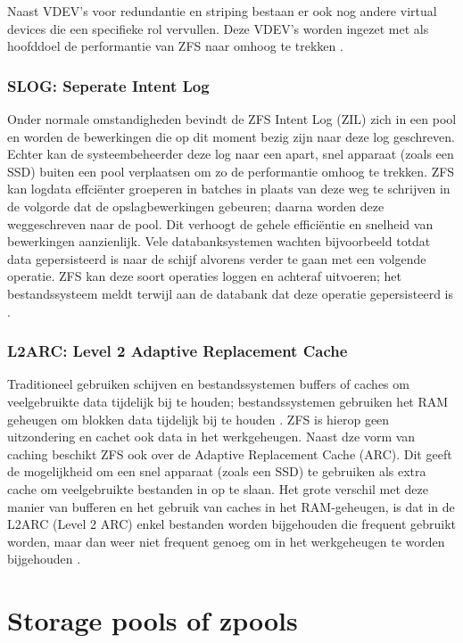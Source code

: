 Naast VDEV's voor redundantie en striping bestaan er ook nog andere virtual devices die een specifieke rol vervullen. Deze VDEV's worden ingezet met als hoofddoel de performantie van ZFS naar omhoog te trekken \autocite{Lucas2015}.

\subsubsection{SLOG: Seperate Intent Log}

Onder normale omstandigheden bevindt de ZFS Intent Log (ZIL) zich in een pool en worden de bewerkingen die op dit moment bezig zijn naar deze log geschreven. Echter kan de systeembeheerder deze log naar een apart, snel apparaat (zoals een SSD) buiten een pool verplaatsen om zo de performantie omhoog te trekken. ZFS kan logdata effciënter groeperen in batches in plaats van deze weg te schrijven in de volgorde dat de opslagbewerkingen gebeuren; daarna worden deze weggeschreven naar de pool. Dit verhoogt de gehele efficiëntie en snelheid van bewerkingen aanzienlijk. Vele databanksystemen wachten bijvoorbeeld totdat data gepersisteerd is naar de schijf alvorens verder te gaan met een volgende operatie. ZFS kan deze soort operaties loggen en achteraf uitvoeren; het bestandssysteem meldt terwijl aan de databank dat deze operatie gepersisteerd is \autocite{Lucas2015}.

\subsubsection{L2ARC: Level 2 Adaptive Replacement Cache}

Traditioneel gebruiken schijven en bestandssystemen buffers of caches om veelgebruikte data tijdelijk bij te houden; bestandssystemen gebruiken het RAM geheugen om blokken data tijdelijk bij te houden \autocite{OSThreePiecesRemzi2015}. ZFS is hierop geen uitzondering en cachet ook data in het werkgeheugen. Naast dze vorm van caching beschikt ZFS ook over de Adaptive Replacement Cache (ARC). Dit geeft de mogelijkheid om een snel apparaat (zoals een SSD) te gebruiken als extra cache om veelgebruikte bestanden in op te slaan. Het grote verschil met deze manier van bufferen en het gebruik van caches in het RAM-geheugen, is dat in de L2ARC (Level 2 ARC) enkel bestanden worden bijgehouden die frequent gebruikt worden, maar dan weer niet frequent genoeg om in het werkgeheugen te worden bijgehouden \autocite{Lucas2015}. 

\section{Storage pools of zpools}

